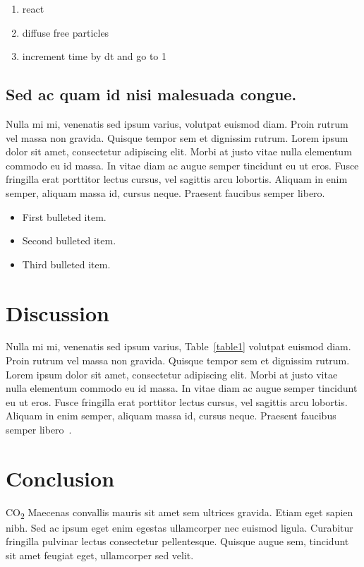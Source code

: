 \documentclass[10pt,letterpaper]{article}
\begin{document}
\begin{enumerate}
	\item{react}
	\item{diffuse free particles}
	\item{increment time by dt and go to 1}
\end{enumerate}

\subsection*{Sed ac quam id nisi malesuada congue.}

Nulla mi mi, venenatis sed ipsum varius, volutpat euismod diam. Proin rutrum vel massa non gravida. Quisque tempor sem et dignissim rutrum. Lorem ipsum dolor sit amet, consectetur adipiscing elit. Morbi at justo vitae nulla elementum commodo eu id massa. In vitae diam ac augue semper tincidunt eu ut eros. Fusce fringilla erat porttitor lectus cursus, vel sagittis arcu lobortis. Aliquam in enim semper, aliquam massa id, cursus neque. Praesent faucibus semper libero.

\begin{itemize}
	\item First bulleted item.
	\item Second bulleted item.
	\item Third bulleted item.
\end{itemize}

\section*{Discussion}

Nulla mi mi, venenatis sed ipsum varius, Table~\ref{table1} volutpat euismod diam. Proin rutrum vel massa non gravida. Quisque tempor sem et dignissim rutrum. Lorem ipsum dolor sit amet, consectetur adipiscing elit. Morbi at justo vitae nulla elementum commodo eu id massa. In vitae diam ac augue semper tincidunt eu ut eros. Fusce fringilla erat porttitor lectus cursus, vel sagittis arcu lobortis. Aliquam in enim semper, aliquam massa id, cursus neque. Praesent faucibus semper libero~\cite{bib3}.

\section*{Conclusion}

CO\textsubscript{2} Maecenas convallis mauris sit amet sem ultrices gravida. Etiam eget sapien nibh. Sed ac ipsum eget enim egestas ullamcorper nec euismod ligula. Curabitur fringilla pulvinar lectus consectetur pellentesque. Quisque augue sem, tincidunt sit amet feugiat eget, ullamcorper sed velit. 
\end{document}
